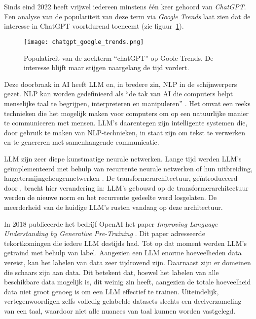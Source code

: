 \section{}%
\label{sec:nlp-llms}

Sinds eind 2022 heeft vrijwel iedereen minstens één keer gehoord van \emph{\gls{ChatGPT}}. Een analyse van de populariteit van deze term via \emph{Google Trends} laat zien dat de interesse in \gls{ChatGPT} voortdurend toeneemt (zie figuur~\ref{fig:chatgpt_google_trends}).

\begin{figure}
    \centering
    \texttt{[image: chatgpt\_google\_trends.png]}
    \caption[Populariteit van de zoekterm ``chatGPT'']{\label{fig:chatgpt_google_trends}Populatireit van de zoekterm ``chatGPT'' op Goole Trends. De interesse blijft maar stijgen naargelang de tijd vordert.}
\end{figure}

Deze doorbraak in \acrlong{AI} heeft \acrfull{LLM} en, in bredere zin, \acrfull{NLP} in de schijnwerpers gezet. \acrshort{NLP} kan worden gedefinieerd als ``de tak van \acrlong{AI} die computers helpt menselijke taal te begrijpen, interpreteren en manipuleren'' \autocite{Zohuri2022}. Het omvat een reeks technieken die het mogelijk maken voor computers om op een natuurlijke manier te communiceren met mensen. \acrshort{LLM}'s daarentegen zijn intelligente systemen die, door gebruik te maken van \acrshort{NLP}-technieken, in staat zijn om tekst te verwerken en te genereren met samenhangende communicatie. 

\acrlong{LLM} zijn zeer diepe kunstmatige neurale netwerken. Lange tijd werden \acrshort{LLM}'s geïmplementeerd met behulp van recurrente neurale netwerken of hun uitbreiding, langetermijngeheugennetwerken \autocite{Delobelle2020}. De transformerarchitectuur, geïntroduceerd door \textcite{Vaswani2017}, bracht hier verandering in: \acrshort{LLM}'s gebouwd op de transformerarchitectuur werden de nieuwe norm en het recurrente gedeelte werd losgelaten. De meerderheid van de huidige \acrshort{LLM}'s rusten vandaag op deze architectuur.

In 2018 publiceerde het bedrijf OpenAI het paper \emph{Improving Language Understanding by Generative Pre-Training} \autocite{Radford2018}. Dit paper adresseerde tekortkomingen die iedere \acrshort{LLM} destijds had. Tot op dat moment werden \acrshort{LLM}'s getraind met behulp van \gls{label}. Aangezien een \acrshort{LLM} enorme hoeveelheden data vereist, kan het labelen van data zeer tijdrovend zijn. Daarnaast zijn er domeinen die schaars zijn aan data. Dit betekent dat, hoewel het labelen van alle beschikbare data mogelijk is, dit weinig zin heeft, aangezien de totale hoeveelheid data niet groot genoeg is om een \acrshort{LLM} effectief te trainen. Uiteindelijk, vertegenwoordigen zelfs volledig gelabelde datasets slechts een deelverzameling van een taal, waardoor niet alle nuances van taal kunnen worden vastgelegd.

